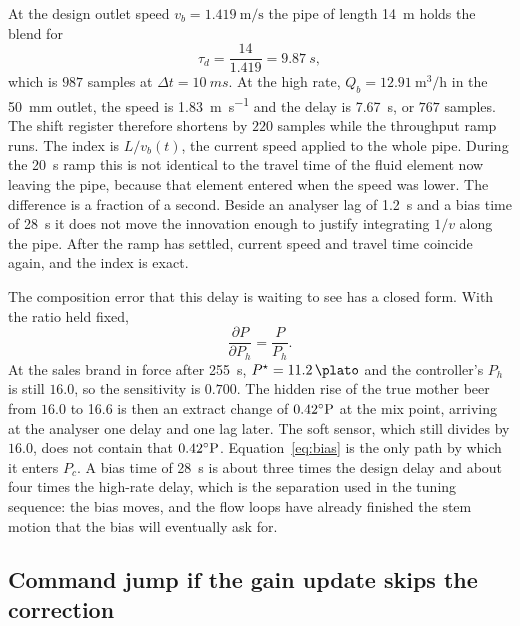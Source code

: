 At the design outlet speed $v_b=\SI{1.419}{\metre\per\second}$ the pipe of length \SI{14}{m} holds the blend for
\begin{equation}
\tau_d = \frac{14}{1.419} = \SI{9.87}{s},
\end{equation}
which is $987$ samples at $\Delta t=\SI{10}{ms}$. At the high rate, $Q_b=\SI{12.91}{\cubic\metre\per\hour}$ in the \SI{50}{mm} outlet, the speed is \SI{1.83}{\metre\per\second} and the delay is \SI{7.67}{s}, or $767$ samples. The shift register therefore shortens by $220$ samples while the throughput ramp runs. The index is $L/v_b(t)$, the current speed applied to the whole pipe. During the \SI{20}{s} ramp this is not identical to the travel time of the fluid element now leaving the pipe, because that element entered when the speed was lower. The difference is a fraction of a second. Beside an analyser lag of \SI{1.2}{s} and a bias time of \SI{28}{s} it does not move the innovation enough to justify integrating $1/v$ along the pipe. After the ramp has settled, current speed and travel time coincide again, and the index is exact.

The composition error that this delay is waiting to see has a closed form. With the ratio held fixed,
\begin{equation}
\frac{\partial P}{\partial P_h} = \frac{P}{P_h}.
\end{equation}
At the sales brand in force after \SI{255}{s}, $P^\star=\SI{11.2}{\plato}$ and the controller's $P_h$ is still $16.0$, so the sensitivity is $0.700$. The hidden rise of the true mother beer from $16.0$ to \SI{16.6}{\plato} is then an extract change of $0.42^{\circ}\mathrm{P}$ at the mix point, arriving at the analyser one delay and one lag later. The soft sensor, which still divides by $16.0$, does not contain that $0.42^{\circ}\mathrm{P}$. Equation~\eqref{eq:bias} is the only path by which it enters $P_c$. A bias time of \SI{28}{s} is about three times the design delay and about four times the high-rate delay, which is the separation used in the tuning sequence: the bias moves, and the flow loops have already finished the stem motion that the bias will eventually ask for.

\subsection{Command jump if the gain update skips the correction}


